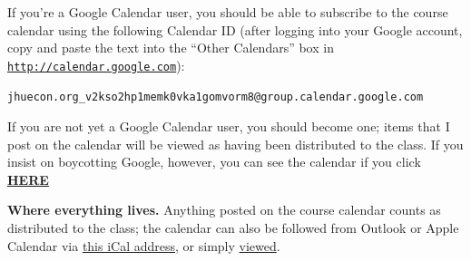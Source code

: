 \documentclass{\econtex}\newcommand{\texname}{Syllabus}
\begin{document}
\begin{small}

If you're a Google Calendar user, you should be able to subscribe to the course calendar using the following Calendar ID (after logging into your Google account, copy and paste the text into the ``Other Calendars'' box in \href{http://calendar.google.com}{\texttt{http://calendar.google.com}}):

\medskip
\centerline{\texttt{jhuecon.org\_v2kso2hp1memk0vka1gomvorm8@group.calendar.google.com}}
\medskip

If you are not yet a Google Calendar user, you should become one; items that I post on the calendar will be viewed as having been distributed to the class.  If you insist on boycotting Google, however, you can see the calendar if you click \href{https://www.google.com/calendar/embed?src=jhuecon.org_v2kso2hp1memk0vka1gomvorm8\%40group.calendar.google.com\&ctz=America/New_York}{\bf HERE}

\medskip

\noindent\textbf{Where everything lives.} Anything posted on the course calendar counts as
distributed to the class; the calendar can also be followed from Outlook or Apple Calendar
via \href{https://calendar.google.com/calendar/ical/jhuecon.org_v2kso2hp1memk0vka1gomvorm8%40group.calendar.google.com/public/basic.ics}{this iCal address},
or simply \href{https://calendar.google.com/calendar/embed?src=jhuecon.org_v2kso2hp1memk0vka1gomvorm8%40group.calendar.google.com}{viewed}.


\end{small}
\end{document}
